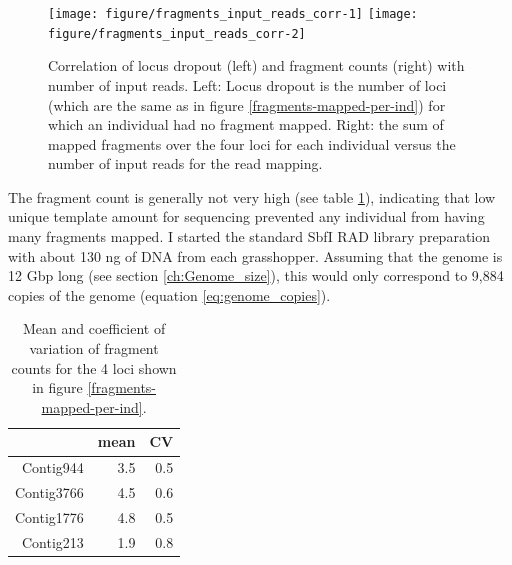 \documentclass[a4paper,12pt,times,print,index, custombib]{PhDThesisPSnPDF}\usepackage[]{graphicx}\usepackage[]{color}
\newenvironment{knitrout}{}{} %
\begin{document}
\begin{figure}
\begin{knitrout}
\color{fgcolor}

{\centering \texttt{[image: figure/fragments\_input\_reads\_corr-1]} 
\texttt{[image: figure/fragments\_input\_reads\_corr-2]} 

}



\end{knitrout}
\caption{Correlation of locus dropout (left) and fragment counts (right) with number of input reads. Left: Locus dropout is the number of loci (which are the same as in figure \ref{fragments-mapped-per-ind}) for which an individual had no \gls{fragment} mapped. Right: the sum of mapped \glspl{fragment} over the four loci for each individual versus the number of input reads for the read mapping.}
\label{frag_input_corr_fig}
\end{figure}

The \gls{fragment} count is generally not very high (see table \ref{mean_sd_fragNum_per_locus}), indicating that low unique template amount for sequencing prevented any individual from having many fragments mapped. I started the standard SbfI RAD library preparation with about 130 ng of DNA from each grasshopper. Assuming that the genome is 12 Gbp long (see section \ref{ch:Genome_size}), this would only correspond to 9,884 copies of the genome (equation \ref{eq:genome_copies}).

\begin{table}[ht]
\centering
\caption{Mean and coefficient of variation of fragment counts for the 4 loci shown in figure \ref{fragments-mapped-per-ind}.} 
\label{mean_sd_fragNum_per_locus}
\begin{tabular}{rrr}
  \toprule
 & mean & CV \\ 
  \midrule
Contig944 & 3.5 & 0.5 \\ 
  Contig3766 & 4.5 & 0.6 \\ 
  Contig1776 & 4.8 & 0.5 \\ 
  Contig213 & 1.9 & 0.8 \\ 
   \bottomrule
\end{tabular}
\end{table}
\end{document}
